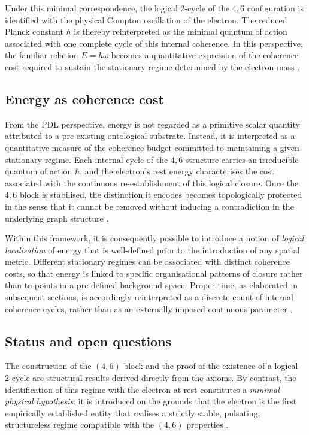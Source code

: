 \documentclass[11pt,a4paper]{article}
\begin{document}
Under this minimal correspondence, the logical 2-cycle of the \(4,6\) configuration is identified with the physical Compton oscillation of the electron. The reduced Planck constant \(\hbar\) is thereby reinterpreted as the minimal quantum of action associated with one complete cycle of this internal coherence. In this perspective, the familiar relation \(E = \hbar \omega\) becomes a quantitative expression of the coherence cost required to sustain the stationary regime determined by the electron mass \citep{PDL_Main_2026}.

\subsection{Energy as coherence cost}
\label{subsec:energy_coherence}

From the PDL perspective, energy is not regarded as a primitive scalar quantity attributed to a pre-existing ontological substrate. Instead, it is interpreted as a quantitative measure of the coherence budget committed to maintaining a given stationary regime. Each internal cycle of the \(4,6\) structure carries an irreducible quantum of action \(\hbar\), and the electron’s rest energy characterises the cost associated with the continuous re-establishment of this logical closure. Once the \(4,6\) block is stabilised, the distinction it encodes becomes topologically protected in the sense that it cannot be removed without inducing a contradiction in the underlying graph structure \citep{PDL_Main_2026,PDL_intro}.

Within this framework, it is consequently possible to introduce a notion of \emph{logical localisation} of energy that is well-defined prior to the introduction of any spatial metric. Different stationary regimes can be associated with distinct coherence costs, so that energy is linked to specific organisational patterns of closure rather than to points in a pre-defined background space. Proper time, as elaborated in subsequent sections, is accordingly reinterpreted as a discrete count of internal coherence cycles, rather than as an externally imposed continuous parameter \citep{PDL_Main_2026,PDL_position}.

\subsection{Status and open questions}
\label{subsec:electron_status}

The construction of the \((4,6)\) block and the proof of the existence of a logical 2-cycle are structural results derived directly from the axioms. By contrast, the identification of this regime with the electron at rest constitutes a \emph{minimal physical hypothesis}: it is introduced on the grounds that the electron is the first empirically established entity that realises a strictly stable, pulsating, structureless regime compatible with the \((4,6)\) properties \citep{PDL_intro}.
\end{document}
